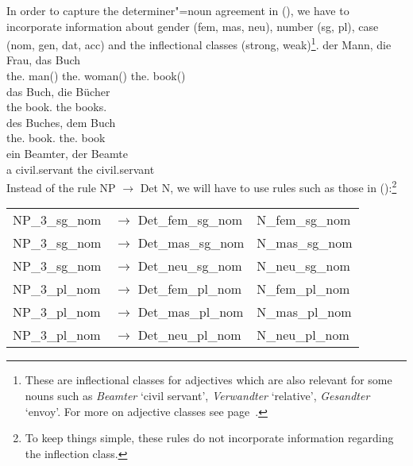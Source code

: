 In order to capture the determiner"=noun agreement in (), we have to incorporate information about gender (fem, mas, neu),
number (sg, pl), case (nom, gen, dat, acc) and the inflectional classes (strong, weak)\footnote{%
These are inflectional classes for adjectives which are also relevant for some nouns such as \emph{Beamter} `civil servant', 
\emph{Verwandter} `relative', \emph{Gesandter} `envoy'.
For more on adjective classes see page~\pageref{page-Flexionsklasse-Wunderlich}.%
}.
\eal\settowidth{}
\ex 
\gll der Mann, die Frau, das Buch\\
	 the.\mas{} man(\mas) the.\fem{} woman(\fem) the.\neu{} book(\neu)\\
\ex 
\gll das Buch, die Bücher\\
	 the book.\sg{} the books.\pl\\
\ex 
\gll des Buches, dem Buch\\
	 the.\gen{} book.\gen{} the.\dat{} book\\
\ex{} 
\gll ein Beamter, der Beamte\\
	 a civil.servant the civil.servant\\
\zl
Instead of the rule NP $\to$ Det N, we will have to use rules such as those in ():\footnote{%
  To keep things simple, these rules do not incorporate information regarding the inflection class.
}
\ea
\begin{tabular}[t]{@{}l@{ }l@{~~}l}
NP\_3\_sg\_nom  & $\to$ Det\_fem\_sg\_nom & N\_fem\_sg\_nom \\
NP\_3\_sg\_nom  & $\to$ Det\_mas\_sg\_nom & N\_mas\_sg\_nom \\
NP\_3\_sg\_nom  & $\to$ Det\_neu\_sg\_nom & N\_neu\_sg\_nom \\
NP\_3\_pl\_nom  & $\to$ Det\_fem\_pl\_nom & N\_fem\_pl\_nom \\
NP\_3\_pl\_nom  & $\to$ Det\_mas\_pl\_nom & N\_mas\_pl\_nom \\
NP\_3\_pl\_nom  & $\to$ Det\_neu\_pl\_nom & N\_neu\_pl\_nom \\[2mm]
\end{tabular}

